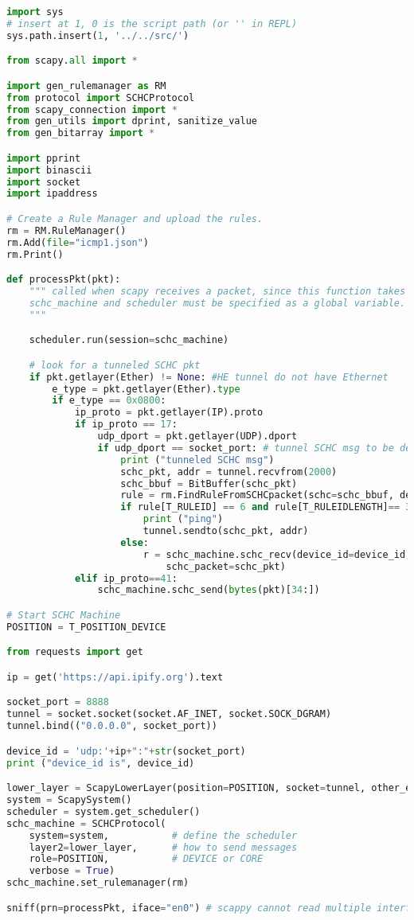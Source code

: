 \begin{lstlisting}[language=Python, caption={Program ping\_device2.py}, label=prog-ping-device2, basicstyle=\ttfamily\scriptsize]
import sys
# insert at 1, 0 is the script path (or '' in REPL)
sys.path.insert(1, '../../src/')

from scapy.all import *

import gen_rulemanager as RM
from protocol import SCHCProtocol
from scapy_connection import *
from gen_utils import dprint, sanitize_value
from gen_bitarray import *

import pprint
import binascii
import socket
import ipaddress

# Create a Rule Manager and upload the rules.
rm = RM.RuleManager()
rm.Add(file="icmp1.json")
rm.Print()

def processPkt(pkt):
    """ called when scapy receives a packet, since this function takes only one argument,
    schc_machine and scheduler must be specified as a global variable.
    """

    scheduler.run(session=schc_machine)

    # look for a tunneled SCHC pkt
    if pkt.getlayer(Ether) != None: #HE tunnel do not have Ethernet
        e_type = pkt.getlayer(Ether).type
        if e_type == 0x0800:
            ip_proto = pkt.getlayer(IP).proto
            if ip_proto == 17:
                udp_dport = pkt.getlayer(UDP).dport
                if udp_dport == socket_port: # tunnel SCHC msg to be decompressed
                    print ("tunneled SCHC msg")                    
                    schc_pkt, addr = tunnel.recvfrom(2000)
                    schc_bbuf = BitBuffer(schc_pkt)
                    rule = rm.FindRuleFromSCHCpacket(schc=schc_bbuf, device=device_id)
                    if rule[T_RULEID] == 6 and rule[T_RULEIDLENGTH]== 3:
                        print ("ping")
                        tunnel.sendto(schc_pkt, addr)
                    else: 
                        r = schc_machine.schc_recv(device_id=device_id, 
                            schc_packet=schc_pkt)
            elif ip_proto==41:
                schc_machine.schc_send(bytes(pkt)[34:])

# Start SCHC Machine
POSITION = T_POSITION_DEVICE

from requests import get

ip = get('https://api.ipify.org').text

socket_port = 8888
tunnel = socket.socket(socket.AF_INET, socket.SOCK_DGRAM)
tunnel.bind(("0.0.0.0", socket_port))

device_id = 'udp:'+ip+":"+str(socket_port)
print ("device_id is", device_id)

lower_layer = ScapyLowerLayer(position=POSITION, socket=tunnel, other_end=None)
system = ScapySystem()
scheduler = system.get_scheduler()
schc_machine = SCHCProtocol(
    system=system,           # define the scheduler
    layer2=lower_layer,      # how to send messages
    role=POSITION,           # DEVICE or CORE
    verbose = True)         
schc_machine.set_rulemanager(rm)

sniff(prn=processPkt, iface="en0") # scappy cannot read multiple interfaces

\end{lstlisting}
